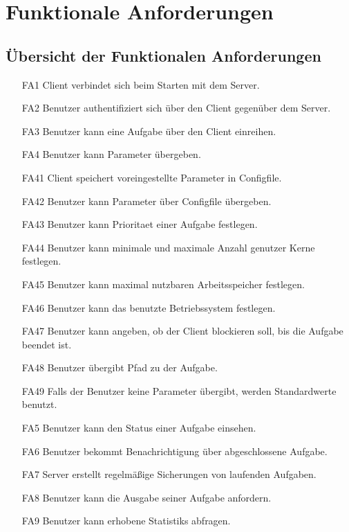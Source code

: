 \documentclass[a4paper,12pt]{article}
\begin{document}
\newpage

\section{Funktionale Anforderungen}

\subsection{Übersicht der  Funktionalen Anforderungen}

\begin{itemize}[nosep]
\leftskip=0.5cm

\item[FA1]	\gls{Client} verbindet sich beim Starten mit dem Server.
\item[FA2] Benutzer authentifiziert sich über den \gls{Client} gegenüber dem Server.
\item[FA3] Benutzer kann eine Aufgabe über den \gls{Client} einreihen.
\item[FA4] Benutzer kann Parameter übergeben.
\item[FA41]	\gls{Client} speichert voreingestellte Parameter in \gls{Configfile}.
\item[FA42]	Benutzer kann Parameter über \gls{Configfile} übergeben.
\item[FA43] Benutzer kann \gls{Prioritaet} einer Aufgabe festlegen.
\item[FA44] Benutzer kann minimale und maximale Anzahl genutzer Kerne festlegen.
\item[FA45] Benutzer kann maximal nutzbaren Arbeitsspeicher festlegen.
\item[FA46] Benutzer kann das benutzte Betriebssystem festlegen.
\item[FA47] Benutzer kann angeben, ob der \gls{Client} blockieren soll, bis die Aufgabe beendet ist.
\item[FA48] Benutzer übergibt Pfad zu der Aufgabe.
\item[FA49] Falls der Benutzer keine Parameter übergibt, werden Standardwerte benutzt.
\item[FA5] Benutzer kann den Status einer Aufgabe einsehen.
\item[FA6] Benutzer bekommt Benachrichtigung über abgeschlossene Aufgabe.
\item[FA7] Server erstellt regelmäßige Sicherungen von laufenden Aufgaben.
\item[FA8] Benutzer kann die Ausgabe seiner Aufgabe anfordern.
\item[FA9] \gls{Benutzer} kann erhobene \glspl{Statistik} abfragen.
\end{itemize}
\newpage
\end{document}
